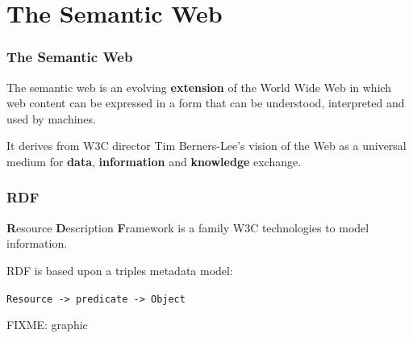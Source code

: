 \documentclass[spanish,notes=hide,16pt]{beamer}
\begin{document}
\section{The Semantic Web}
\frame
{
  \frametitle{The Semantic Web}

  \begin{Large}
    The semantic web is an evolving \textbf{extension} of the World Wide Web in 
    which web content can be expressed in a form that can be understood, 
    interpreted and used by machines.
  \end{Large}
  
  \vspace{1cm}

  \begin{Large}
    It derives from W3C director Tim Berners-Lee's vision of the Web as a universal 
    medium for \textbf{data}, \textbf{information} and \textbf{knowledge} exchange.
  \end{Large}
}
\frame
{
  \frametitle{RDF}

  \begin{Large}
     \textbf{R}esource \textbf{D}escription \textbf{F}ramework is a family W3C
     technologies to model information.
  \end{Large}

  \vspace{1cm}

  \begin{Large}
     RDF is based upon a triples metadata model:
     \begin{center}
       \texttt{Resource -> predicate -> Object}
     \end{center}
  \end{Large}
  FIXME: graphic
}
\end{document}
